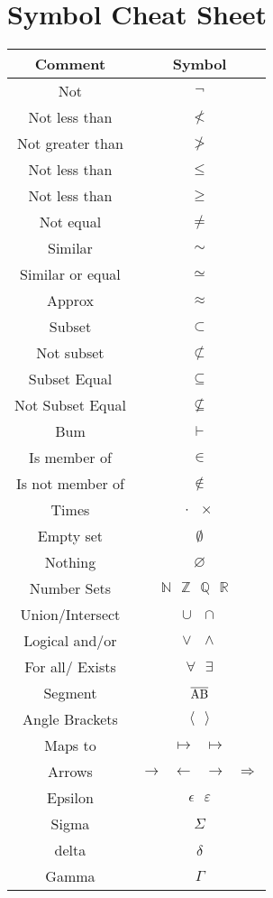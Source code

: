 \section*{Symbol Cheat Sheet}

\begin{tabular}{|c|c|} \hline
    \textbf{Comment}    & \textbf{Symbol} \\ \hline
    Not                 & $\neg$ \\ \hline
    Not less than       & $\not<$ \\ \hline
    Not greater than    & $\not>$ \\ \hline
    Not less than       & $\leq$ \\ \hline
    Not less than       & $\geq$ \\ \hline
    Not equal           & $\neq$ \\ \hline
    Similar             & $\sim$ \\ \hline
    Similar or equal    & $\simeq$ \\ \hline
    Approx              & $\approx$ \\ \hline
    Subset              & $\subset$ \\ \hline
    Not subset          & $\not\subset$ \\ \hline
    Subset Equal        & $\subseteq$ \\ \hline
    Not Subset Equal    & $\not\subseteq$ \\ \hline
    Bum                 & $\vdash$ \\ \hline
    Is member of        & $\in$ \\ \hline
    Is not member of    & $\notin$ \\ \hline
    Times               & $\cdot\text{ }\times$ \\ \hline
    Empty set           & $\emptyset$ \\ \hline
    Nothing             & $\varnothing$ \\ \hline
    Number Sets         & $\mathbb{N}\text{ }\mathbb{Z}\text{ }\mathbb{Q}\text{ }\mathbb{R}\text{ }$ \\ \hline
    Union/Intersect     & $\cup\text{ }\cap$ \\ \hline
    Logical and/or      & $\lor\text{ }\land$ \\ \hline
    For all/ Exists     & $\forall\text{ }\exists$ \\ \hline
    Segment             & $\overline{\rm AB}$ \\ \hline
    Angle Brackets      & $\langle\text{ }\rangle$ \\ \hline
    Maps to             & $\mapsto\text{ }\longmapsto$ \\ \hline
    Arrows              & $\rightarrow\text{ }\leftarrow\text{ }\longrightarrow\text{ }\Rightarrow$ \\ \hline
    Epsilon             & $\epsilon\text{ }\varepsilon$ \\ \hline
    Sigma               & $\Sigma$ \\ \hline
    delta               & $\delta$ \\ \hline
    Gamma               & $\Gamma$ \\ \hline
\end{tabular}

